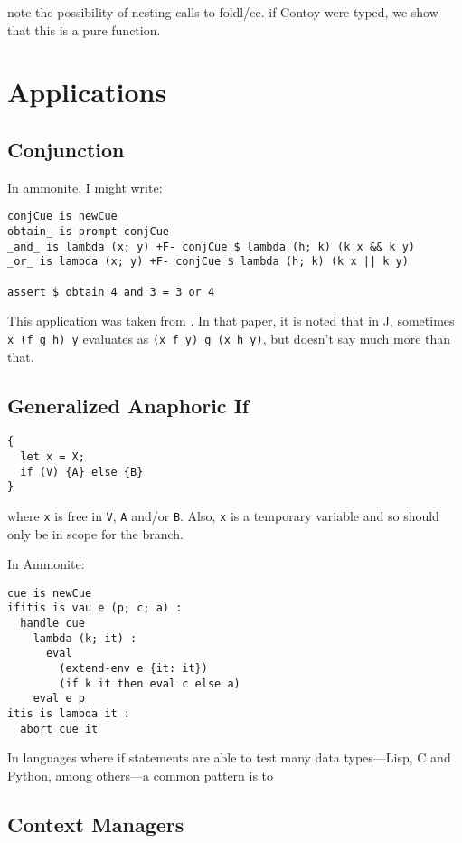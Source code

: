 \documentclass[11pt]{article}
\begin{document}
note the possibility of nesting calls to foldl/ee.
if Contoy were typed, we show that this is a pure function.

\section{Applications}
\label{application}

\subsection{Conjunction}

In ammonite, I might write:

\begin{verbatim}
conjCue is newCue
obtain_ is prompt conjCue
_and_ is lambda (x; y) +F- conjCue $ lambda (h; k) (k x && k y)
_or_ is lambda (x; y) +F- conjCue $ lambda (h; k) (k x || k y)

assert $ obtain 4 and 3 = 3 or 4
\end{verbatim}

This application was taken from \cite{ContInNatlang}. In that paper, it is noted that in J, sometimes \texttt{x (f g h) y} evaluates as \texttt{(x f y) g (x h y)}, but doesn't say much more than that.

\subsection{Generalized Anaphoric If}

\begin{verbatim}
{
  let x = X;
  if (V) {A} else {B}
}
\end{verbatim}
where \texttt{x} is free in \texttt{V}, \texttt{A} and/or \texttt{B}.
Also, \texttt{x} is a temporary variable and so should only be in scope for the branch.

In Ammonite:
\begin{verbatim}
cue is newCue
ifitis is vau e (p; c; a) :
  handle cue 
  	lambda (k; it) :
      eval
        (extend-env e {it: it})
        (if k it then eval c else a)
	eval e p
itis is lambda it :
  abort cue it
\end{verbatim}

In languages where if statements are able to test many data types---Lisp, C and Python, among others---a common pattern is to 


\subsection{Context Managers}
\end{document}
